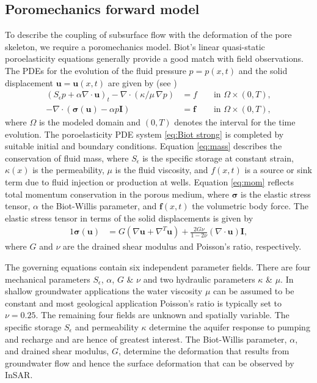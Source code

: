 \documentclass[11pt,final]{article}%
\newcommand{\I}{\boldsymbol{I}}
\newcommand{\Stor}{S_{\epsilon}}
\renewcommand{\u}{\ensuremath{\boldsymbol{u}}}
\newcommand{\s}{\boldsymbol\sigma}
\newcommand{\f}{\ensuremath{\boldsymbol{f}}}
\renewcommand{\citet}{\cite}
\begin{document}
\subsection{Poromechanics forward model}
\label{sec:poromech}

To describe the coupling of subsurface flow with the deformation of
the pore skeleton, we require a poromechanics model. Biot's linear
quasi-static poroelasticity equations  \citet{Biot1941}
generally provide a good match with field observations. The PDEs
for the evolution of the fluid pressure $p=p(x,t)$ and the solid
displacement $\u=\u(x,t)$ are given by (see \citet{Wang2000})
\begin{subequations}\label{eq:Biot strong}
\begin{alignat}{2}
\left(\Stor p+\alpha\nabla\cdot\u\right)_t-\nabla\cdot\left(\kappa/\mu\, \nabla p\right)&=f &&  \text{ in }\Omega\times (0,T), \label{eq:mass}\\
 -\nabla\cdot\left(\s(\u) -\alpha p\I\right)&=\f && \text{ in }\Omega\times (0,T), \label{eq:mom}
\end{alignat}
\end{subequations}
where $\Omega$ is the modeled domain and $(0,T)$ denotes the interval for the time evolution.  The poroelasticity PDE system \eqref{eq:Biot strong} is completed by suitable initial and boundary
conditions.  Equation \eqref{eq:mass} describes the conservation of fluid mass, where $\Stor$ is the specific storage at constant strain, $\kappa(x)$ is the permeability, $\mu$ is the fluid viscosity, and
$f(x,t)$ is a source or sink term due to fluid injection or production at wells.  Equation \eqref{eq:mom} reflects total momentum conservation in the porous medium, where $\s$ is the elastic stress
tensor, $\alpha$ the Biot-Willis parameter, and $\f(x,t)$ the volumetric body force.  The elastic stress
tensor in terms of the solid displacements is given by
\begin{alignat*}{1}
 \s(\u)&=G\left(\nabla\u+\nabla^{T}\u\right)+\frac{2G\nu}{1-2\nu}\left(\nabla\cdot\u\right)\I, %
\end{alignat*}
where $G$ and $\nu$ are the drained shear modulus and Poisson's ratio, respectively.  

The governing equations contain six independent parameter fields. There are four mechanical parameters $\Stor$, $\alpha$, $G$ \& $\nu$ and two hydraulic parameters $\kappa$ \& $\mu$. In shallow groundwater applications the water viscosity $\mu$ can be assumed to be constant and most geological application Poisson's ratio is typically set to $\nu = 0.25$. The remaining four fields are unknown and spatially variable. The specific storage $\Stor$ and permeability $\kappa$ determine the aquifer response to pumping and recharge and are hence of greatest interest. The Biot-Willis parameter, $\alpha$, and drained shear modulus, $G$, determine the deformation that results from groundwater flow and hence the surface deformation that can be observed by InSAR.
\end{document}
